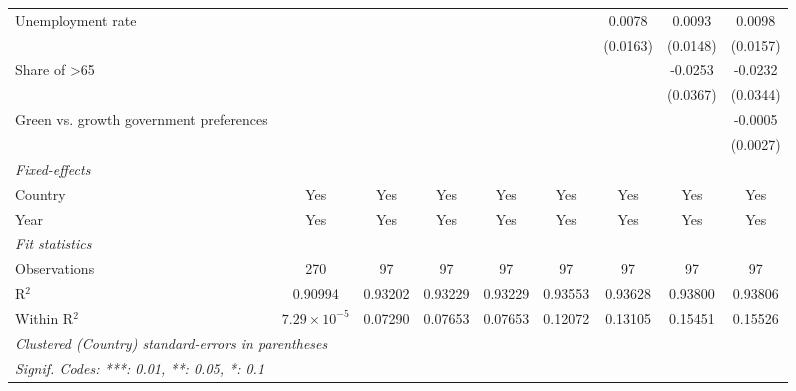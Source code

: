 \begin{table}[htbp]
\begin{tabular}{lcccccccc}
      Unemployment rate                                      &                       &          &          &          &          & 0.0078   & 0.0093   & 0.0098\\   
                                                             &                       &          &          &          &          & (0.0163) & (0.0148) & (0.0157)\\   
      Share of >65                                           &                       &          &          &          &          &          & -0.0253  & -0.0232\\   
                                                             &                       &          &          &          &          &          & (0.0367) & (0.0344)\\   
      Green vs. growth government preferences                &                       &          &          &          &          &          &          & -0.0005\\   
                                                             &                       &          &          &          &          &          &          & (0.0027)\\   
      \midrule
      \emph{Fixed-effects}\\
      Country                                                & Yes                   & Yes      & Yes      & Yes      & Yes      & Yes      & Yes      & Yes\\  
      Year                                                   & Yes                   & Yes      & Yes      & Yes      & Yes      & Yes      & Yes      & Yes\\  
      \midrule
      \emph{Fit statistics}\\
      Observations                                           & 270                   & 97       & 97       & 97       & 97       & 97       & 97       & 97\\  
      R$^2$                                                  & 0.90994               & 0.93202  & 0.93229  & 0.93229  & 0.93553  & 0.93628  & 0.93800  & 0.93806\\  
      Within R$^2$                                           & $7.29\times 10^{-5}$  & 0.07290  & 0.07653  & 0.07653  & 0.12072  & 0.13105  & 0.15451  & 0.15526\\  
      \midrule \midrule
      \multicolumn{9}{l}{\emph{Clustered (Country) standard-errors in parentheses}}\\
      \multicolumn{9}{l}{\emph{Signif. Codes: ***: 0.01, **: 0.05, *: 0.1}}\\
   \end{tabular}
\end{table}


